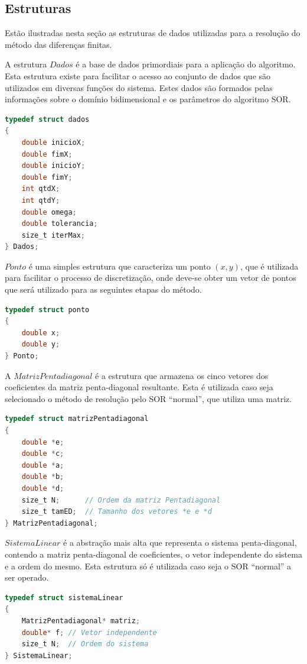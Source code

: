 \documentclass[
	11pt,				%
	oneside,			%
	a4paper,			%
	english,			%
	brazil,				%
	]{article}
\begin{document}
\subsection{Estruturas}
Estão ilustradas nesta seção as estruturas de dados utilizadas para a resolução 
do método das diferenças finitas.

A estrutura $Dados$ é a base de dados primordiais para a aplicação do 
algoritmo. Esta estrutura existe para facilitar o acesso ao conjunto de dados 
que são utilizados em diversas funções do sistema. Estes dados são formados 
pelas informações sobre o domínio bidimensional e os parâmetros do algoritmo 
SOR.
\begin{lstlisting}[language=C, caption=Estrutura de entrada]
typedef struct dados
{
	double inicioX;
	double fimX;
	double inicioY;
	double fimY;
	int qtdX;
	int qtdY;
	double omega;
	double tolerancia;
	size_t iterMax;
} Dados;
\end{lstlisting}

$Ponto$ é uma simples estrutura que caracteriza um ponto $(x,y)$, que é 
utilizada para facilitar o processo de discretização, onde deve-se obter um 
vetor de pontos que será utilizado para as seguintes etapas do método.
\begin{lstlisting}[language=C, caption=Estrutura Ponto]
typedef struct ponto
{
	double x;
	double y;
} Ponto;
\end{lstlisting}

A $MatrizPentadiagonal$ é a estrutura que armazena os cinco vetores dos 
coeficientes da matriz penta-diagonal resultante. Esta é utilizada caso seja 
selecionado o método de resolução pelo SOR ``normal'', que utiliza uma matriz.
\begin{lstlisting}[language=C, caption=Matriz Pentadiagonal]
typedef struct matrizPentadiagonal
{
	double *e;
	double *c;
	double *a;
	double *b;
	double *d;
    size_t N;      // Ordem da matriz Pentadiagonal
    size_t tamED;  // Tamanho dos vetores *e e *d
} MatrizPentadiagonal;
\end{lstlisting}

$SistemaLinear$ é a abstração mais alta que representa o sistema 
penta-diagonal, contendo a matriz penta-diagonal de coeficientes, o vetor 
independente do sistema e a ordem do mesmo. Esta estrutura só é utilizada caso 
seja o SOR ``normal'' a ser operado.
\begin{lstlisting}[language=C, caption=Sistema Linear]
typedef struct sistemaLinear
{
    MatrizPentadiagonal* matriz;
    double* f; // Vetor independente
    size_t N;  // Ordem do sistema
} SistemaLinear;
\end{lstlisting}
\end{document}
